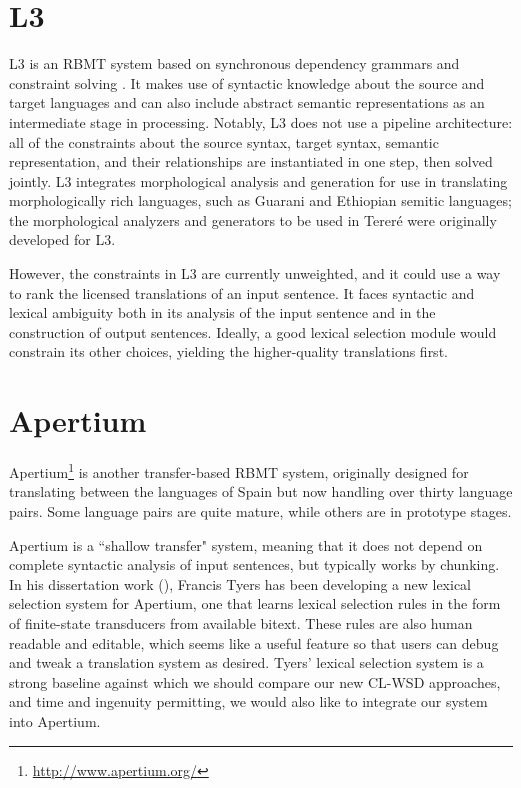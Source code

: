 \section{L3}
L3 is an RBMT system based on synchronous dependency grammars and constraint
solving \cite{gasser:sxdg,gasser:aflat2012}.  It makes use of syntactic
knowledge about the source and target languages and can also include abstract
semantic representations as an intermediate stage in processing. Notably, L3
does not use a pipeline architecture: all of the constraints about the source
syntax, target syntax, semantic representation, and their relationships are
instantiated in one step, then solved jointly. L3 integrates morphological
analysis and generation for use in translating morphologically rich languages,
such as Guarani and Ethiopian semitic languages;
the morphological analyzers and generators to be used in Tereré were originally
developed for L3.

However, the constraints in L3 are currently unweighted, and it could use a way
to rank the licensed translations of an input sentence. It faces syntactic and
lexical ambiguity both in its analysis of the input sentence and in the
construction of output sentences. Ideally, a good lexical selection module
would constrain its other choices, yielding the higher-quality translations
first.

\section{Apertium}
Apertium\footnote{\url{http://www.apertium.org/}} \cite{Forcada_theapertium} is
another transfer-based RBMT system, originally designed for translating between
the languages of Spain but now handling over thirty language pairs. Some
language pairs are quite mature, while others are in prototype stages.

Apertium is a ``shallow transfer" system, meaning that it does not depend on
complete syntactic analysis of input sentences, but typically works by
chunking.
In his dissertation work (\cite{tyers-fst,tyers-thesis}), Francis Tyers has
been developing a new lexical selection system for Apertium, one that learns
lexical selection rules in the form of finite-state transducers from available
bitext. These rules are also human readable and editable, which seems like a
useful feature so that users can debug and tweak a translation system as
desired.
Tyers' lexical selection system is a strong baseline against which we should
compare our new CL-WSD approaches, and time and ingenuity permitting, we would
also like to integrate our system into Apertium.
